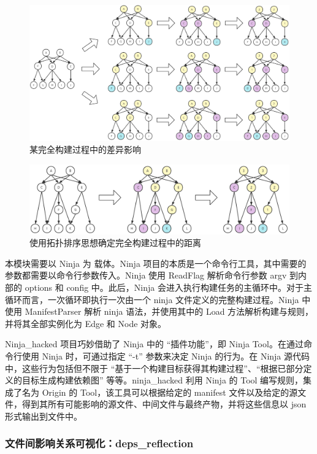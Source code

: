 \begin{figure}[htb]
    \centering
    \includegraphics[width=.9\textwidth]{figures/ninja-hacked-bfs.png}
    \caption{某完全构建过程中的差异影响}
    \label{fig:ninja-hacked-bfs}
\end{figure}

\begin{figure}[htb]
    \centering
    \includegraphics[width=.9\textwidth]{figures/ninja-hacked-topology-sort.png}
    \caption{使用拓扑排序思想确定完全构建过程中的距离}
    \label{fig:ninja-hacked-topology-sort}
\end{figure}

本模块需要以 Ninja 为 载体。Ninja 项目的本质是一个命令行工具，其中需要的参数都需要以命令行参数传入。Ninja 使用 ReadFlag 解析命令行参数 argv 到内部的 options 和 config 中。此后，Ninja 会进入执行构建任务的主循环中。对于主循环而言，一次循环即执行一次由一个 ninja 文件定义的完整构建过程。Ninja 中使用 ManifestParser 解析 ninja 语法，并使用其中的 Load 方法解析构建与规则，并将其全部实例化为 Edge 和 Node 对象。

Ninja\_hacked 项目巧妙借助了 Ninja 中的 “插件功能”，即 Ninja Tool。在通过命令行使用 Ninja 时，可通过指定 “-t” 参数来决定 Ninja 的行为。在 Ninja 源代码中，这些行为包括但不限于 “基于一个构建目标获得其构建过程”、“根据已部分定义的目标生成构建依赖图” 等等。ninja\_hacked 利用 Ninja 的 Tool 编写规则，集成了名为 Origin 的 Tool，该工具可以根据给定的 manifest 文件以及给定的源文件，得到其所有可能影响的源文件、中间文件与最终产物，并将这些信息以 json 形式输出到文件中。

\subsubsection{文件间影响关系可视化：deps\_reflection}


